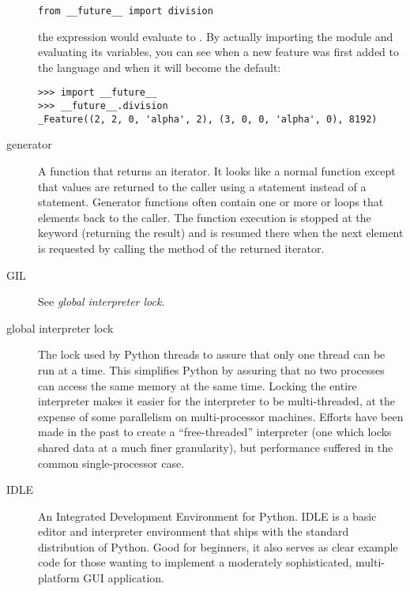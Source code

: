 \begin{description}
\begin{verbatim}
from __future__ import division
\end{verbatim}

the expression  would evaluate to .  By actually
importing the 
module and evaluating its variables, you can see when a new feature
was first added to the language and when it will become the default:

\begin{verbatim}
>>> import __future__
>>> __future__.division
_Feature((2, 2, 0, 'alpha', 2), (3, 0, 0, 'alpha', 0), 8192)
\end{verbatim}

\item[generator]
A function that returns an iterator.  It looks like a normal function except
that values are returned to the caller using a  statement
instead of a {} statement.  Generator functions often
contain one or more {} or  loops that
 elements back to the caller.  The function execution is
stopped at the {} keyword (returning the result) and is
resumed there when the next element is requested by calling the
 method of the returned iterator.

\item[GIL]
See \emph{global interpreter lock}.

\item[global interpreter lock]
The lock used by Python threads to assure that only one thread can be
run at a time.  This simplifies Python by assuring that no two
processes can access the same memory at the same time.  Locking the
entire interpreter makes it easier for the interpreter to be
multi-threaded, at the expense of some parallelism on multi-processor
machines.  Efforts have been made in the past to create a
``free-threaded'' interpreter (one which locks shared data at a much
finer granularity), but performance suffered in the common
single-processor case.

\item[IDLE]
An Integrated Development Environment for Python.  IDLE is a
basic editor and interpreter environment that ships with the standard
distribution of Python.  Good for beginners, it also serves as clear
example code for those wanting to implement a moderately
sophisticated, multi-platform GUI application.


\end{description}
